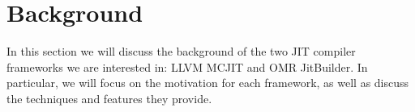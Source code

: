 \section{Background}
In this section we will discuss the background of the two JIT compiler frameworks we are interested in: LLVM MCJIT and OMR JitBuilder.
In particular, we will focus on the motivation for each framework, as well as discuss the techniques and features they provide.

